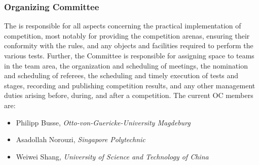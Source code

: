 \subsubsection{Organizing Committee}
The  is responsible for all aspects concerning the practical implementation of competition, most notably for providing the competition arenas, ensuring their conformity with the rules, and any objects and facilities required to perform the various tests. Further, the Committee is responsible for assigning space to teams in the team area, the organization and scheduling of meetings, the nomination and scheduling of referees, the scheduling and timely execution of tests and stages, recording and publishing competition results, and any other management duties arising before, during, and after a competition. The current OC members are:

\begin{itemize}
	\item Philipp Busse, \textit{Otto-von-Guericke-University Magdeburg}
	\item Asadollah Norouzi, \textit{Singapore Polytechnic}
	\item Weiwei Shang, \textit{University of Science and Technology of China}
\end{itemize}





